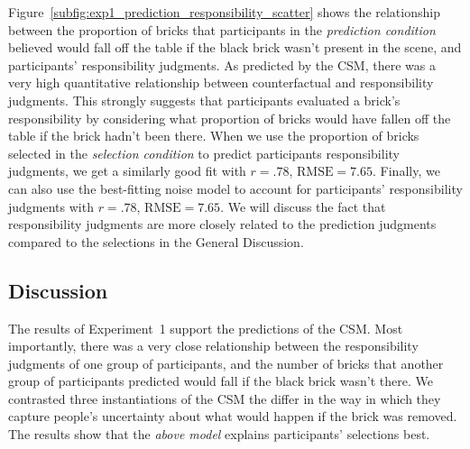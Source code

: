 \documentclass[10pt, letterpaper]{article}
\begin{document}
Figure~\ref{subfig:exp1_prediction_responsibility_scatter} shows the relationship between the proportion of bricks that participants in the \emph{prediction condition} believed would fall off the table if the black brick wasn't present in the scene, and participants' responsibility judgments. As predicted by the CSM, there was a very high quantitative relationship between counterfactual and responsibility judgments. This strongly suggests that participants evaluated a brick's responsibility by considering what proportion of bricks would have fallen off the table if the brick hadn't been there. When we use the proportion of bricks selected in the \emph{selection condition}  to predict participants responsibility judgments, we get a similarly good fit with $r = .78$, $\text{RMSE} = 7.65$. Finally, we can also use the best-fitting noise model to account for participants' responsibility judgments with $r = .78$, $\text{RMSE} = 7.65$. We will discuss the fact that responsibility judgments are more closely related to the prediction judgments compared to the selections in the General Discussion.

\subsection{Discussion}
\label{sub:discussion}

The results of Experiment~1 support the predictions of the CSM. Most importantly, there was a very close relationship between the responsibility judgments of one group of participants, and the number of bricks that another group of participants predicted would fall if the black brick wasn't there. We contrasted three instantiations of the CSM the differ in the way in which they capture people's uncertainty about what would happen if the brick was removed. The results show that the \emph{above model} explains participants' selections best. 


\end{document}
